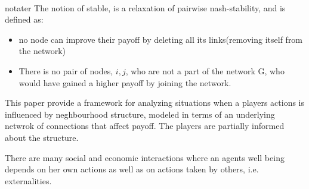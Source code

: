 \\notater
The notion of stable, is a relaxation of pairwise nash-stability, and is defined as:
\begin{itemize}
\item no node can improve their payoff by deleting all its links(removing itself from the network)
\item There is no pair of nodes, $i,j$, who are not a part of the network G, who would have gained a higher payoff by joining the network.
\end{itemize}

This paper\cite{networkgames}  provide a framework for analyzing situations when a players actions is influenced by neghbourhood structure, modeled in terms of an underlying netwrok of connections that affect payoff.
The players are partially informed about the structure. 

There are many social and economic interactions where an agents well being depends on her own actions as well as on actions taken by others, i.e. externalities. 


